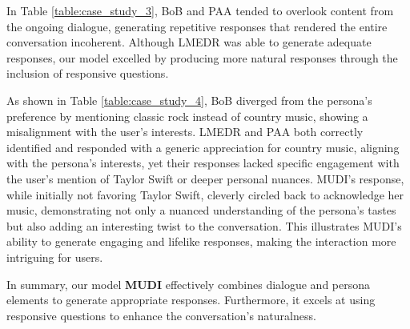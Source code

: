 In Table \ref{table:case_study_3}, BoB and PAA tended to overlook content from the ongoing dialogue, generating repetitive responses that rendered the entire conversation incoherent. Although LMEDR was able to generate adequate responses, our model excelled by producing more natural responses through the inclusion of responsive questions. 

As shown in Table \ref{table:case_study_4}, BoB diverged from the persona's preference by mentioning classic rock instead of country music, showing a misalignment with the user’s interests. LMEDR and PAA both correctly identified and responded with a generic appreciation for country music, aligning with the persona’s interests, yet their responses lacked specific engagement with the user’s mention of Taylor Swift or deeper personal nuances. MUDI's response, while initially not favoring Taylor Swift, cleverly circled back to acknowledge her music, demonstrating not only a nuanced understanding of the persona's tastes but also adding an interesting twist to the conversation. This illustrates MUDI's ability to generate engaging and lifelike responses, making the interaction more intriguing for users.

In summary, our model \textbf{MUDI} effectively combines dialogue and persona elements to generate appropriate responses. Furthermore, it excels at using responsive questions to enhance the conversation's naturalness.



